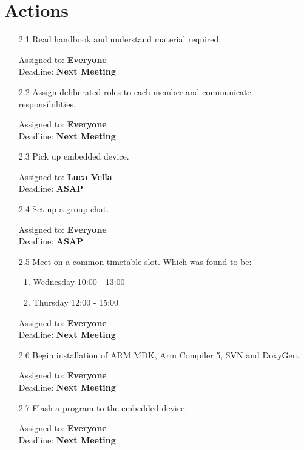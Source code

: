 \documentclass{cce2014-meetings}
\begin{document}
\section*{Actions}

\begin{enumerate}

\item [2.1] Read handbook and understand material required.
\begin{flushright}
Assigned to: \textbf{Everyone} \\
Deadline: \textbf{Next Meeting}
\end{flushright}

\item [2.2] Assign deliberated roles to each member and communicate responsibilities.
\begin{flushright}
Assigned to: \textbf{Everyone} \\
Deadline: \textbf{Next Meeting}
\end{flushright}

\item [2.3] Pick up embedded device.
\begin{flushright}
Assigned to: \textbf{Luca Vella} \\
Deadline: \textbf{ASAP}
\end{flushright}

\item [2.4] Set up a group chat.
\begin{flushright}
Assigned to: \textbf{Everyone} \\
Deadline: \textbf{ASAP}
\end{flushright}

\item [2.5] Meet on a common timetable slot. Which was found to be: 
\begin{enumerate}
   \item Wednesday 10:00 - 13:00
   \item Thursday 12:00 - 15:00
\end{enumerate}
\begin{flushright}
Assigned to: \textbf{Everyone} \\
Deadline: \textbf{Next Meeting}
\end{flushright}

\item [2.6] Begin installation of ARM MDK, Arm Compiler 5, SVN and DoxyGen.
\begin{flushright}
Assigned to: \textbf{Everyone} \\
Deadline: \textbf{Next Meeting}
\end{flushright}

\item [2.7] Flash a program to the embedded device.
\begin{flushright}
Assigned to: \textbf{Everyone} \\
Deadline: \textbf{Next Meeting}
\end{flushright}

\end{enumerate}
\end{document}
